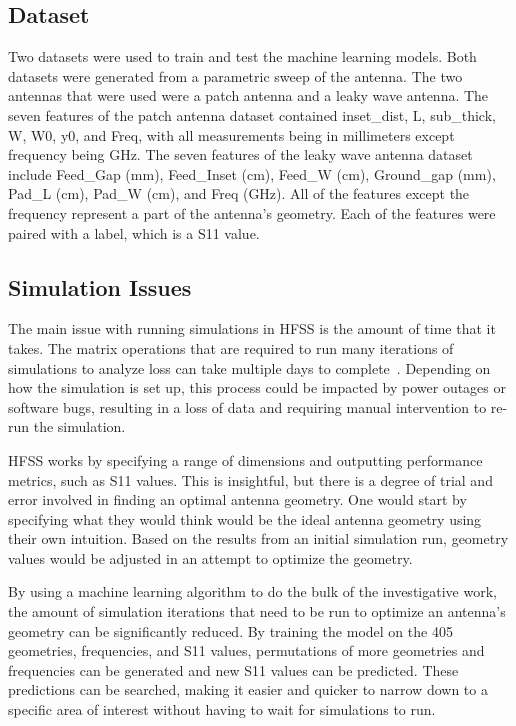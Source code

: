 \documentclass[lettersize,journal]{IEEEtran}
\begin{document}
\subsection{Dataset}
Two datasets were used to train and test the machine learning models. Both datasets were generated from a parametric sweep of the antenna. The two antennas that were used were a patch antenna and a leaky wave antenna. The seven features of the patch antenna dataset contained inset\_dist, L, sub\_thick, W, W0, y0, and Freq, with all measurements being in millimeters except frequency being GHz. The seven features of the leaky wave antenna dataset include Feed\_Gap (mm), Feed\_Inset (cm), Feed\_W (cm), Ground\_gap (mm), Pad\_L (cm), Pad\_W (cm), and Freq (GHz). All of the features except the frequency represent a part of the antenna's geometry. Each of the features were paired with a label, which is a S11 value. 


\subsection{Simulation Issues}
The main issue with running simulations in HFSS is the amount of time that it takes. The matrix operations that are required to run many iterations of simulations to analyze loss can take multiple days to complete~\cite{john_antenna_2009,liu_efficient_2014}. Depending on how the simulation is set up, this process could be impacted by power outages or software bugs, resulting in a loss of data and requiring manual intervention to re-run the simulation. 

HFSS works by specifying a range of dimensions and outputting performance metrics, such as S11 values. This is insightful, but there is a degree of trial and error involved in finding an optimal antenna geometry. One would start by specifying what they would think would be the ideal antenna geometry using their own intuition. Based on the results from an initial simulation run, geometry values would be adjusted in an attempt to optimize the geometry.

By using a machine learning algorithm to do the bulk of the investigative work, the amount of simulation iterations that need to be run to optimize an antenna's geometry can be significantly reduced. By training the model on the 405 geometries, frequencies, and S11 values, permutations of more geometries and frequencies can be generated and new S11 values can be predicted. These predictions can be searched, making it easier and quicker to narrow down to a specific area of interest without having to wait for simulations to run.
\end{document}
